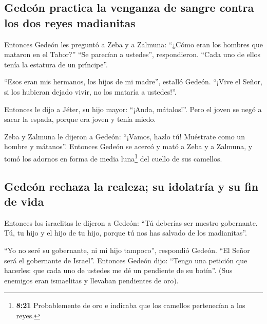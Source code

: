\hypertarget{gedeuxf3n-practica-la-venganza-de-sangre-contra-los-dos-reyes-madianitas}{%
\subsection{Gedeón practica la venganza de sangre contra los dos reyes
madianitas}\label{gedeuxf3n-practica-la-venganza-de-sangre-contra-los-dos-reyes-madianitas}}

 Entonces Gedeón les preguntó a Zeba y a Zalmuna: ``¿Cómo
eran los hombres que mataron en el Tabor?'' ``Se parecían a ustedes'',
respondieron. ``Cada uno de ellos tenía la estatura de un príncipe''.

 ``Esos eran mis hermanos, los hijos de mi madre'',
estalló Gedeón. ``¡Vive el Señor, si los hubieran dejado vivir, no los
mataría a ustedes!''.

 Entonces le dijo a Jéter, su hijo mayor: ``¡Anda,
mátalos!''. Pero el joven se negó a sacar la espada, porque era joven y
tenía miedo.

 Zeba y Zalmuna le dijeron a Gedeón: ``¡Vamos, hazlo tú!
Muéstrate como un hombre y mátanos''. Entonces Gedeón se acercó y mató a
Zeba y a Zalmuna, y tomó los adornos en forma de media luna\footnote{\textbf{8:21}
  Probablemente de oro e indicaba que los camellos pertenecían a los
  reyes.} del cuello de sus camellos.

\hypertarget{gedeuxf3n-rechaza-la-realeza-su-idolatruxeda-y-su-fin-de-vida}{%
\subsection{Gedeón rechaza la realeza; su idolatría y su fin de
vida}\label{gedeuxf3n-rechaza-la-realeza-su-idolatruxeda-y-su-fin-de-vida}}

 Entonces los israelitas le dijeron a Gedeón: ``Tú
deberías ser nuestro gobernante. Tú, tu hijo y el hijo de tu hijo,
porque tú nos has salvado de los madianitas''.

 ``Yo no seré su gobernante, ni mi hijo tampoco'',
respondió Gedeón. ``El Señor será el gobernante de Israel''.
 Entonces Gedeón dijo: ``Tengo una petición que hacerles:
que cada uno de ustedes me dé un pendiente de su botín''. (Sus enemigos
eran ismaelitas y llevaban pendientes de oro).

